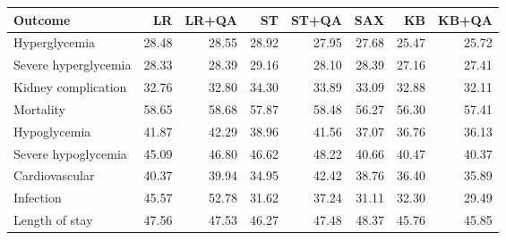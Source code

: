 \begin{tabular}{lrrrrrrr}
\toprule
Outcome & LR & LR+QA & ST & ST+QA & SAX & KB & KB+QA \\
\midrule
Hyperglycemia & 28.48 & 28.55 & 28.92 & 27.95 & 27.68 & 25.47 & 25.72 \\
Severe hyperglycemia & 28.33 & 28.39 & 29.16 & 28.10 & 28.39 & 27.16 & 27.41 \\
Kidney complication & 32.76 & 32.80 & 34.30 & 33.89 & 33.09 & 32.88 & 32.11 \\
Mortality & 58.65 & 58.68 & 57.87 & 58.48 & 56.27 & 56.30 & 57.41 \\
Hypoglycemia & 41.87 & 42.29 & 38.96 & 41.56 & 37.07 & 36.76 & 36.13 \\
Severe hypoglycemia & 45.09 & 46.80 & 46.62 & 48.22 & 40.66 & 40.47 & 40.37 \\
Cardiovascular & 40.37 & 39.94 & 34.95 & 42.42 & 38.76 & 36.40 & 35.89 \\
Infection & 45.57 & 52.78 & 31.62 & 37.24 & 31.11 & 32.30 & 29.49 \\
Length of stay & 47.56 & 47.53 & 46.27 & 47.48 & 48.37 & 45.76 & 45.85 \\
\bottomrule
\end{tabular}
